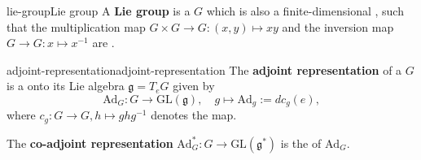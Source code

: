 \begin{topic}{lie-group}{Lie group}
    A \textbf{Lie group} is a  $G$ which is also a finite-dimensional , such that the multiplication map $G \times G \to G : (x, y) \mapsto xy$ and the inversion map $G \to G : x \mapsto x^{-1}$ are .
\end{topic}

\begin{topic}{adjoint-representation}{adjoint-representation}
    The \textbf{adjoint representation} of a  $G$ is a  onto its Lie algebra $\mathfrak{g} = T_e G$ given by
    \[ \text{Ad}_G : G \to \text{GL}(\mathfrak{g}), \quad g \mapsto \text{Ad}_g := d c_g(e) , \]
    where $c_g : G \to G, h \mapsto g h g^{-1}$ denotes the  map.
    
    The \textbf{co-adjoint representation} $\text{Ad}_G^* : G \to \text{GL}(\mathfrak{g}^*)$ is the  of $\text{Ad}_G$.
\end{topic}
